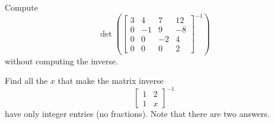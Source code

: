 \begin{exercise}
Compute
\begin{equation*}
\det \left( \begin{bmatrix}
3 & 4 & 7 & 12 \\
0 & -1 & 9 & -8 \\
0 & 0 & -2 & 4 \\
0 & 0 & 0 & 2
\end{bmatrix}^{-1}
\right)
\end{equation*}
without computing the inverse.
\end{exercise}

\begin{exercise}[challenging]
Find all the $x$ that make the matrix inverse
\begin{equation*}
\begin{bmatrix}
1 & 2 \\ 1 & x
\end{bmatrix}^{-1}
\end{equation*}
have only integer entries (no fractions).
Note that there are two answers.
\end{exercise}
